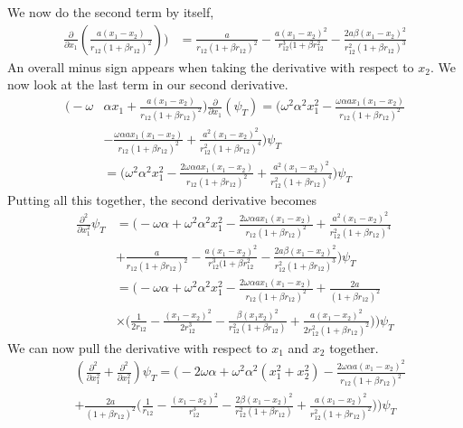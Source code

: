 \documentclass[11pt]{article}
\begin{document}
We now do the second term by itself,
\begin{align*}
	\frac{\partial}{\partial x_1}\left( \frac{a(x_1-x_2)}{r_{12}(1+\beta r_{12})^2} \right) \bigg) &= \frac{a}{r_{12}(1+\beta r_{12})^2} - \frac{a(x_1-x_2)^2}{r_{12}^3(1+\beta r_{12}^2} - \frac{2a\beta(x_1-x_2)^2}{r_{12}^2(1+\beta r_12)^3}
\end{align*}
An overall minus sign appears when taking the derivative with respect to $x_2$. We now look at the last term in our second derivative.
\begin{align*}
	\bigg(-\omega &\alpha x_1 + \frac{a(x_1-x_2)}{r_{12}(1+\beta r_{12})^2} \bigg) \frac{\partial}{\partial x_1}\left(\psi_T\right) = \bigg( \omega^2\alpha^2 x_1^2 - \frac{\omega\alpha a x_1(x_1-x_2)}{r_{12}(1+\beta r_{12})^2} \\
	& - \frac{\omega\alpha a x_1 (x_1 - x_2)}{r_{12}(1+\beta r_{12})^2} + \frac{a^2(x_1 - x_2)^2}{r_{12}^2(1+\beta r_{12})^4}\bigg) \psi_T \\
	&= \bigg( \omega^2\alpha^2 x_1^2 - \frac{2\omega\alpha a x_1(x_1-x_2)}{r_{12}(1+\beta r_{12})^2} + \frac{a^2(x_1 - x_2)^2}{r_{12}^2(1+\beta r_{12})^4}\bigg) \psi_T
\end{align*}
Putting all this together, the second derivative becomes
\begin{align*}
	\frac{\partial^2}{\partial x_1^2} \psi_T &= \bigg( - \omega \alpha + \omega^2\alpha^2 x_1^2 - \frac{2\omega\alpha a x_1(x_1-x_2)}{r_{12}(1+\beta r_{12})^2} + \frac{a^2(x_1 - x_2)^2}{r_{12}^2(1+\beta r_{12})^4} \\
	& + \frac{a}{r_{12}(1+\beta r_{12})^2} - \frac{a(x_1-x_2)^2}{r_{12}^3(1+\beta r_{12}^2} - \frac{2a\beta(x_1-x_2)^2}{r_{12}^2(1+\beta r_12)^3} \bigg) \psi_T \\
	&= \bigg( - \omega \alpha + \omega^2\alpha^2 x_1^2 - \frac{2\omega\alpha a x_1(x_1-x_2)}{r_{12}(1+\beta r_{12})^2} + \frac{2a}{(1+\beta r_{12})^2} 
	\\ &\times \bigg( \frac{1}{2r_{12}} - \frac{(x_1 - x_2)^2}{2 r_{12}^3} - \frac{\beta (x_1 x_2)^2}{r_{12}^2(1+\beta r_{12})} + \frac{a(x_1-x_2)^2}{2r_{12}^2(1+\beta r_{12})^2} \bigg) \bigg) \psi_T
\end{align*}
We can now pull the derivative with respect to $x_1$ and $x_2$ together.
\begin{align*}
	&\left( \frac{\partial^2}{\partial x_1^2} + \frac{\partial^2}{\partial x_1^2} \right)\psi_T = \bigg( - 2\omega \alpha + \omega^2\alpha^2 \left(x_1^2 + x_2^2\right) - \frac{2\omega\alpha a (x_1 - x_2)^2}{r_{12}(1+\beta r_{12})^2} \\
	&+ \frac{2a}{(1+\beta r_{12})^2} \bigg( \frac{1}{r_{12}} - \frac{(x_1 - x_2)^2}{r_{12}^3} - \frac{2\beta (x_1 - x_2)^2}{r_{12}^2(1+\beta r_{12})} + \frac{a(x_1-x_2)^2}{r_{12}^2(1+\beta r_{12})^2} \bigg) \bigg) \psi_T
\end{align*}
\end{document}
